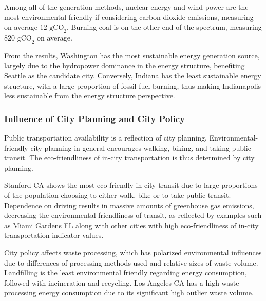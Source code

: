 \documentclass{mcmthesis}
\begin{document}
Among all of the generation methods, nuclear energy and wind power are the most environmental friendly if considering carbon dioxide emissions, measuring on average $12 \text{ gCO}_2$. Burning coal is on the other end of the spectrum, measuring $820 \text{ gCO}_2$ on average. 

From the results, Washington has the most sustainable energy generation source, largely due to the hydropower dominance in the energy structure, benefiting Seattle as the candidate city. Conversely, Indiana has the least sustainable energy structure, with a large proportion of fossil fuel burning, thus making Indianapolis less sustainable from the energy structure perspective.  

\subsubsection{Influence of City Planning and City Policy} \label{subsubsec:indicator_insights_city}

Public transportation availability is a reflection of city planning. Environmental-friendly city planning in general encourages walking, biking, and taking public transit. The eco-friendliness of in-city transportation is thus determined by city planning. 

Stanford CA shows the most eco-friendly in-city transit due to large proportions of the population choosing to either walk, bike or to take public transit. Dependence on driving results in massive amounts of greenhouse gas emissions, decreasing the environmental friendliness of transit, as reflected by examples such as Miami Gardens FL along with other cities with high eco-friendliness of in-city transportation indicator values. 

City policy affects waste processing, which has polarized environmental influences due to differences of processing methods used and relative sizes of waste volume. Landfilling is the least environmental friendly regarding energy consumption, followed with incineration and recycling. Los Angeles CA has a high waste-processing energy consumption due to its significant high outlier waste volume. 
\end{document}
